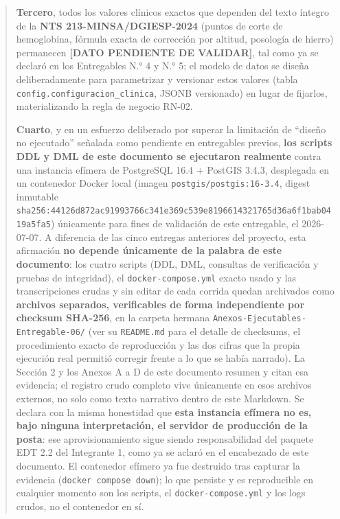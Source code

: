 \documentclass[11pt,a4paper]{article}
\begin{document}
\begin{quote}
\textbf{Tercero}, todos los valores clínicos exactos que dependen del texto íntegro de la \textbf{NTS 213-MINSA/DGIESP-2024} (puntos de corte de hemoglobina, fórmula exacta de corrección por altitud, posología de hierro) permanecen \textbf{{[}DATO PENDIENTE DE VALIDAR{]}}, tal como ya se declaró en los Entregables N.° 4 y N.° 5; el modelo de datos se diseña deliberadamente para parametrizar y versionar estos valores (tabla \texttt{config.configuracion\_clinica}, JSONB versionado) en lugar de fijarlos, materializando la regla de negocio RN-02.

\textbf{Cuarto}, y en un esfuerzo deliberado por superar la limitación de ``diseño no ejecutado'' señalada como pendiente en entregables previos, \textbf{los scripts DDL y DML de este documento se ejecutaron realmente} contra una instancia efímera de PostgreSQL 16.4 + PostGIS 3.4.3, desplegada en un contenedor Docker local (imagen \texttt{postgis/postgis:16-3.4}, digest inmutable \texttt{sha256:44126d872ac91993766c341e369c539e8196614321765d36a6f1bab0419a5fa5}) únicamente para fines de validación de este entregable, el 2026-07-07. A diferencia de las cinco entregas anteriores del proyecto, esta afirmación \textbf{no depende únicamente de la palabra de este documento}: los cuatro scripts (DDL, DML, consultas de verificación y pruebas de integridad), el \texttt{docker-compose.yml} exacto usado y las transcripciones crudas y sin editar de cada corrida quedan archivados como \textbf{archivos separados, verificables de forma independiente por checksum SHA-256}, en la carpeta hermana \texttt{Anexos-Ejecutables-Entregable-06/} (ver su \texttt{README.md} para el detalle de checksums, el procedimiento exacto de reproducción y las dos cifras que la propia ejecución real permitió corregir frente a lo que se había narrado). La Sección 2 y los Anexos A a D de este documento resumen y citan esa evidencia; el registro crudo completo vive únicamente en esos archivos externos, no solo como texto narrativo dentro de este Markdown. Se declara con la misma honestidad que \textbf{esta instancia efímera no es, bajo ninguna interpretación, el servidor de producción de la posta}: ese aprovisionamiento sigue siendo responsabilidad del paquete EDT 2.2 del Integrante 1, como ya se aclaró en el encabezado de este documento. El contenedor efímero ya fue destruido tras capturar la evidencia (\texttt{docker\ compose\ down}); lo que persiste y es reproducible en cualquier momento son los scripts, el \texttt{docker-compose.yml} y los logs crudos, no el contenedor en sí.


\end{quote}
\end{document}
